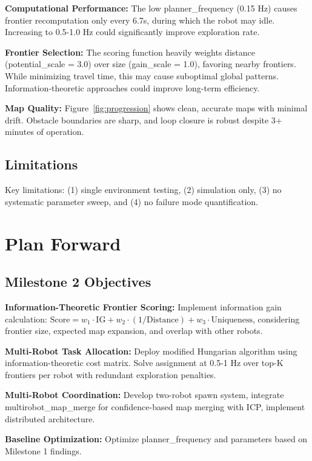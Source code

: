 \documentclass[conference]{IEEEtran}
\begin{document}
\textbf{Computational Performance:} The low planner\_frequency (0.15 Hz) causes frontier recomputation only every 6.7s, during which the robot may idle. Increasing to 0.5-1.0 Hz could significantly improve exploration rate.

\textbf{Frontier Selection:} The scoring function heavily weights distance (potential\_scale = 3.0) over size (gain\_scale = 1.0), favoring nearby frontiers. While minimizing travel time, this may cause suboptimal global patterns. Information-theoretic approaches could improve long-term efficiency.

\textbf{Map Quality:} Figure~\ref{fig:progression} shows clean, accurate maps with minimal drift. Obstacle boundaries are sharp, and loop closure is robust despite 3+ minutes of operation.

\subsection{Limitations}

Key limitations: (1) single environment testing, (2) simulation only, (3) no systematic parameter sweep, and (4) no failure mode quantification.

\section{Plan Forward}

\subsection{Milestone 2 Objectives}

\textbf{Information-Theoretic Frontier Scoring:} Implement information gain calculation: $\text{Score} = w_1 \cdot \text{IG} + w_2 \cdot (1/\text{Distance}) + w_3 \cdot \text{Uniqueness}$, considering frontier size, expected map expansion, and overlap with other robots.

\textbf{Multi-Robot Task Allocation:} Deploy modified Hungarian algorithm using information-theoretic cost matrix. Solve assignment at 0.5-1 Hz over top-K frontiers per robot with redundant exploration penalties.

\textbf{Multi-Robot Coordination:} Develop two-robot spawn system, integrate multirobot\_map\_merge for confidence-based map merging with ICP, implement distributed architecture.

\textbf{Baseline Optimization:} Optimize planner\_frequency and parameters based on Milestone 1 findings.
\end{document}
